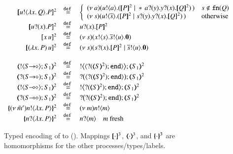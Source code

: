 \begin{figure}[t]
	\[
	\begin{array}{rcl}
		\pmap{\bout{u}{\abs{x}{Q}} P}{2} & \defeq &  \left\{
		\begin{array}{ll}
			\newsp{a}{\bout{u}{a} (\pmap{P}{2} \Par \repl{} \binp{a}{y} \binp{y}{x} \pmap{Q}{2})\,} & s \notin \fn{Q} \\
			\newsp{s}{\bout{u}{\dual{s}} (\pmap{P}{2} \Par \binp{s}{y} \binp{y}{x} \pmap{Q}{2})\,} & \textrm{otherwise} %
		\end{array}
		\right.
		\\
		\pmap{\binp{u}{x} P}{2} &\defeq&  \binp{u}{x} \pmap{P}{2}
		\\
		\pmap{\appl{x}{u}}{2} & \defeq & \newsp{s}{\bout{x}{s} \bout{\dual{s}}{u} \inact}
		\\
		\pmap{\appl{(\abs{x}{P})}{u}}{2} & \defeq & \newsp{s}{\binp{s}{x} \pmap{P}{2} \Par \bout{\dual{s}}{u} \inact}
		\\
		\\
		\tmap{\btout{\shot{S}}S_1}{2} & \defeq & \bbtout{\chtype{\btinp{\tmap{S}{2}}\tinact}}\tmap{S_1}{2} \\
		\tmap{\btinp{\shot{S}}S_1}{2} & \defeq & \bbtinp{\chtype{\btinp{\tmap{S}{2}}\tinact}}\tmap{S_1}{2} \\

		\tmap{\btout{\lhot{S}}S_1}{2} & \defeq & \bbtout{\btinp{\tmap{S}{2}}\tinact}\tmap{S_1}{2} \\
		\tmap{\btinp{\lhot{S}}S_1}{2} & \defeq & \bbtinp{\btinp{\tmap{S}{2}}\tinact}\tmap{S_1}{2} \\
		\mapa{\news{\tilde{m}'}\bactout{n}{\abs{ x}{P}} }^{2} &  \defeq & \news{m} \bactout{n}{m} \\
		\mapa{\bactinp{n}{\abs{ x}{P}} }^{2} &  \defeq & \bactinp{n}{m} \quad m \textrm{ fresh}
	\end{array}
	\]
	\caption{
		Typed encoding of 
		\HOp to \sessp ().
		\label{fig:enc:HOp_to_p}
		Mappings 
		$[\!\![\cdot]\!\!]^3$,
		$(\!\!\langle\cdot\rangle\!\!)^3$, 
		and 
		$\{\!\!\{\cdot\}\!\!\}^3$
		are homomorphisms for the other processes/types/labels. 
	}
\end{figure}
